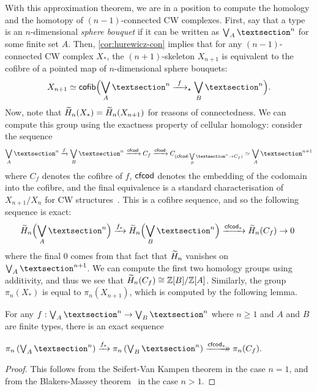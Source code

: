 \documentclass[a4page]{article}
\begin{document}
With this approximation theorem, we are in a position to compute the homology and the homotopy
of \( (n - 1) \)-connected CW complexes.
%
First, say that a type is an \( n \)-dimensional \emph{sphere bouquet} if it can be
written as \( \bouquetGen{A}{n} \) for some finite set \( A \).
%
Then, \cref{cor:hurewicz-con} implies that for any \( (n - 1) \)-connected CW complex \( X_\ast \), the
\( (n+1) \)-skeleton \( X_{n+1} \) is equivalent to the cofibre of a pointed map of
\( n \)-dimensional sphere bouquets:
%
\[
X_{n+1} \simeq \mathsf{cofib}\Big( \bouquetGen{A}{n} \xrightarrow{\ f\ }_\star \bouquetGen{B}{n} \Big).
\]
%
Now, note that \( \textnormal{\ensuremath{\widetilde{H}_{n}}}(X_\ast) = \textnormal{\ensuremath{\widetilde{H}_{n}}}(X_{n+1})\) for reasons of connectedness.
%
We can compute this group using the exactness property of cellular homology:
consider the sequence
%
\[
\bouquetGenL{A}{n} \xrightarrow{f} \bouquetGenL{B}{n} \xrightarrow{\cfcod} C_f
\xrightarrow{\cfcod} C_{(\cfcod : \bouquetGenL{B}{n} \to C_f)} \simeq \bouquetGenL{A}{n+1}
\]
%
where \( C_f \) denotes the cofibre of \( f \), \( \textnormal{\ensuremath{\textsf{cfcod}}} \) denotes the embedding
of the codomain into the cofibre, and the final equivalence is a standard characterisation
of $X_{n+1}/X_{n}$ for CW structures~\cite{BuchholtzFavonia18}.
%
This is a cofibre sequence, and so the following sequence is exact:
%
\[
\!\!\hredstr{n}\Big(\bouquetGen{A}{n}\Big) \xrightarrow{f_*} \hredstr{n}\Big(\bouquetGen{B}{n}\Big) \xrightarrow{\cfcod_*} \hredstr{n}{(C_f)} \to 0
\]
%
where the final $0$ comes from that fact that $\textnormal{\ensuremath{\widetilde{H}_{n}}}$ vanishes on $\bouquetGen{A}{n+1}$.
We can compute the first two homology groups using additivity, and thus we see that
$\textnormal{\ensuremath{\widetilde{H}_{n}}}(C_f) \cong \mathbb{Z}[B]/\mathbb{Z}[A]$.
%
Similarly, the group $\pi_n(X_\ast)$ is equal to \( \pi_n(X_{n+1}) \), which is computed
by the following lemma.

\begin{proposition}\label{prop:hurewicz-seq}
  For any $f : \bouquetGen{A}{n} \to \bouquetGen{B}{n}$ where $n\geq 1$ and $A$ and $B$ are finite
  types, there is an exact sequence
  \begin{center}
    \( \pi_n\left(\bouquetGen{A}{n}\right) \xrightarrow{f_*} \pi_n\left(\bouquetGen{B}{n}\right)
       \dhxrightarrow{\cfcod_*} \pi_n(C_f). \)
  \end{center}
\end{proposition}

\begin{proof}
  This follows from the Seifert-Van Kampen theorem \cite[Example 8.7.17]{HoTT13} in the case
  \( n = 1 \), and from the Blakers-Massey theorem~\cite{FavoniaFinster+16} in the case \( n > 1 \).
\end{proof}
\end{document}
